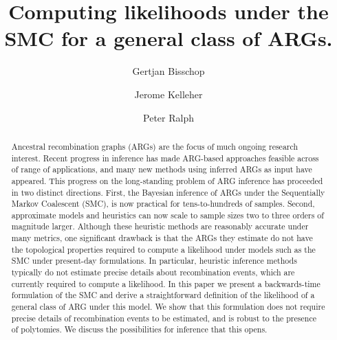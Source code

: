 \documentclass{article}
\begin{document}
\linenumbers
\title{Computing likelihoods under the SMC for a general class of ARGs.}

\author[1, $\dagger$]{Gertjan Bisschop}
\author[1]{Jerome Kelleher}
\author[3]{Peter Ralph}


\maketitle


\begin{abstract}
Ancestral recombination graphs (ARGs) are the focus of much ongoing research
interest. Recent progress in inference has made ARG-based approaches feasible
across of range of applications, and many new methods using inferred ARGs as
input have appeared. This progress on the long-standing problem of ARG
inference has proceeded in two distinct directions. First,
the Bayesian inference of ARGs under the Sequentially Markov
Coalescent (SMC), is now practical for tens-to-hundreds of samples. 
Second, approximate models and heuristics can now scale to sample sizes two to three
orders of magnitude larger. Although these heuristic methods are reasonably
accurate under many metrics, one significant drawback is that the ARGs they 
estimate do not have the topological properties required to compute a 
likelihood under models such as the SMC under present-day formulations.
In particular, heuristic inference methods typically do not estimate
precise details about recombination events, which are currently
required to compute a likelihood.
In this paper we present a 
backwards-time formulation of the SMC 
and derive a straightforward definition 
of the likelihood of a general class of ARG under this model. 
We show that this formulation does not require precise details of recombination events
to be estimated, and is robust to the presence of polytomies. 
We discuss the possibilities for inference that this opens.
\end{abstract}


\end{document}
